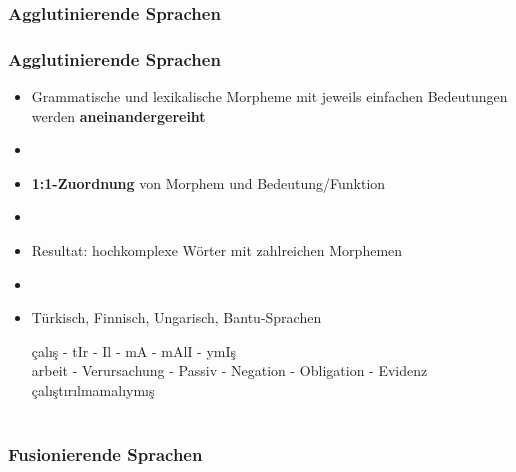 \subsubsection{Agglutinierende Sprachen}


\begin{frame}
\frametitle{Agglutinierende Sprachen}

\begin{itemize}
	\item Grammatische und lexikalische Morpheme mit jeweils einfachen Bedeutungen werden \textbf{aneinandergereiht}
	\item[]
	\item \textbf{1:1-Zuordnung} von Morphem und Bedeutung/Funktion
	\item[]
	\item Resultat: hochkomplexe Wörter mit zahlreichen Morphemen
	\item[]
	\item Türkisch, Finnisch, Ungarisch, Bantu-Sprachen
	
	\ea
	\gll	çalış - tIr - Il - mA - mAlI - ymIş\\
			arbeit - Verursachung - Passiv - Negation - Obligation - Evidenz \\
			çalıştırılmamalıymış \\
			 \\
	\z
			

\end{itemize}


\end{frame}


\subsubsection{Fusionierende Sprachen}


